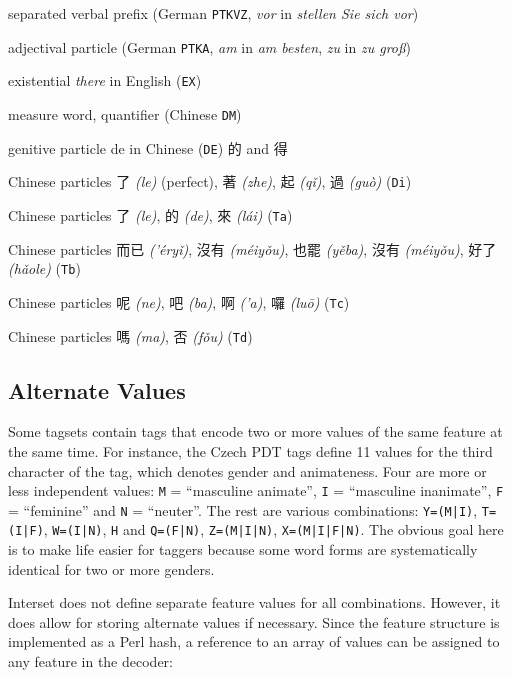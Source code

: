 \documentclass[11pt]{article}
\newcommand{\zh}[1]{{\zhfont #1}}
\newcommand{\translit}[1]{{\translitfont \textit{(#1)}}}
\begin{document}
\begin{compactitem}
\item separated verbal prefix (German \texttt{PTKVZ}, \textit{vor} in \textit{stellen Sie sich vor})
\item adjectival particle (German \texttt{PTKA}, \textit{am} in \textit{am besten}, \textit{zu} in \textit{zu groß})
\item existential \textit{there} in English (\texttt{EX})
\item measure word, quantifier (Chinese \texttt{DM})
\item genitive particle de in Chinese (\texttt{DE}) \zh{的} and \zh{得}
\item Chinese particles \zh{了} \translit{le} (perfect), \zh{著} \translit{zhe}, \zh{起} \translit{qǐ}, \zh{過} \translit{guò} (\texttt{Di})
\item Chinese particles \zh{了} \translit{le}, \zh{的} \translit{de}, \zh{來} \translit{lái} (\texttt{Ta})
\item Chinese particles \zh{而已} \translit{'éryǐ}, \zh{沒有} \translit{méiyǒu}, \zh{也罷} \translit{yěba}, \zh{沒有} \translit{méiyǒu}, \zh{好了} \translit{hǎole} (\texttt{Tb})
\item Chinese particles \zh{呢} \translit{ne}, \zh{吧} \translit{ba}, \zh{啊} \translit{'a}, \zh{囉} \translit{luō} (\texttt{Tc})
\item Chinese particles \zh{嗎} \translit{ma}, \zh{否} \translit{fǒu} (\texttt{Td})
\end{compactitem}

\subsection{Alternate Values}
\label{sec:valuearrays}

Some tagsets contain tags that encode two or more values of the same feature at the same time. For instance, the Czech PDT tags define 11 values for the third character of the tag, which denotes gender and animateness. Four are more or less independent values: \texttt{M} = ``masculine animate'', \texttt{I} = ``masculine inanimate'', \texttt{F} = ``feminine'' and \texttt{N} = ``neuter''. The rest are various combinations: \texttt{Y=(M|I)}, \texttt{T=(I|F)}, \texttt{W=(I|N)}, \texttt{H} and \texttt{Q=(F|N)}, \texttt{Z=(M|I|N)}, \texttt{X=(M|I|F|N)}. The obvious goal here is to make life easier for taggers because some word forms are systematically identical for two or more genders.

Interset does not define separate feature values for all combinations. However, it does allow for storing alternate values if necessary. Since the feature structure is implemented as a Perl hash, a reference to an array of values can be assigned to any feature in the decoder:
\end{document}
